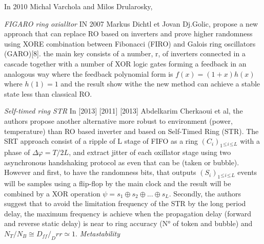 In 2010 Michal Varchola and Milos Drularosky,

\textit{FIGARO ring oxialltor} IN 2007 Markus Dichtl et Jovan Dj.Golic, propose a new approach that can replace RO based on inverters and prove higher randomness using XORE combination between Fibonacci (FIRO) and Galois ring oscillators (GARO)[8]. the main key consists of a number, r, of inverters connected in a cascade together with a number of XOR logic gates forming a feedback in an analogous way where the feedback polynomial form is $f(x) = (1+x)h(x)$ where $h(1)=1$ and the result show withe the new method can achieve a stable state less than classical RO. 

\textit{Self-timed ring STR} In [2013] [2011] [2013] Abdelkarim Cherkaoui et al, the authors propose another alternative more robust to environment (power, temperature) than RO based inverter and based on Self-Timed Ring (STR). The SRT approach consist of a ripple of L stage of FIFO as a ring $(C_{i})_{1}{_{\leq}}{_{i}}{_{\leq}}{_{L}}$ with a phase of $\Delta \varphi = T/2L$, and extract jitter of each oxillator stage using two asynchronous handshaking protocol as even that can be (taken or bubble). However and first, to have the randomness bits, that outputs $(S_{i})_{1}{_{\leq}}{_{i}}{_{\leq}}{_{L}}$ events will be samples using a flip-flop by the main clock and the result will be combined by a XOR operation $\psi = s_{1} \oplus s_{2} \oplus ... \oplus s_{L}$. Secondly, the authors suggest that to avoid the limitation frequency of the STR by the long period delay, the maximum frequency is achieve when the propagation delay (forward and reverse static delay) is near to ring accuracy (N° of token and bubble) and $N_{T}/N_{B} \cong D_{ff}/_D{rr} \simeq 1$.
\textit{Metastability}
